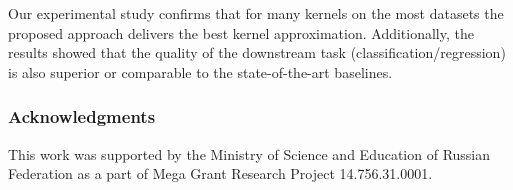 Our experimental study confirms that for many kernels on the most datasets the proposed approach delivers the best kernel approximation. Additionally, the results showed that the quality of the downstream task (classification/regression) is also superior or comparable to the state-of-the-art baselines.
\nocite{*}

\subsubsection*{Acknowledgments}
This work was supported by the Ministry of Science and Education of Russian Federation as a part of Mega Grant Research Project 14.756.31.0001.

\small


